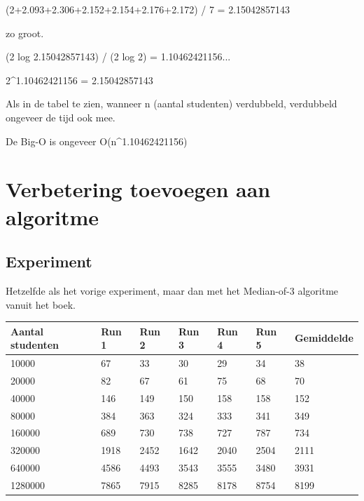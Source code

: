 \documentclass[12pt,notitlepage]{article}
\begin{document}
(2+2.093+2.306+2.152+2.154+2.176+2.172) / 7 = 2.15042857143

zo groot.

(2 log 2.15042857143) / (2 log 2) = 1.10462421156...

2^{1.10462421156} = 2.15042857143

Als in de tabel te zien, wanneer n (aantal studenten) verdubbeld, verdubbeld ongeveer de tijd ook mee.

De Big-O is ongeveer O(n^{1.10462421156})	

\section{Verbetering toevoegen aan algoritme}

\subsection{Experiment}

Hetzelfde als het vorige experiment, maar dan met het Median-of-3 algoritme vanuit het boek.

\begin{center}
\begin{table}[htb]
\begin{tabular}{| l | l | l | l | l | l | l |}
\hline
Aantal studenten & Run 1 & Run 2 & Run 3 & Run 4 & Run 5 & Gemiddelde\\ \hline
10000 & 67 & 33 & 30 & 29 & 34 & 38\\ \hline
20000 & 82 & 67 & 61 & 75 & 68 & 70\\ \hline
40000 & 146 & 149 & 150 & 158 & 158 & 152\\ \hline
80000 & 384 & 363 & 324 & 333 & 341 & 349\\ \hline
160000 & 689 & 730 & 738 & 727 & 787 & 734\\ \hline
320000 & 1918 & 2452 & 1642 & 2040 & 2504 & 2111\\ \hline
640000 & 4586 & 4493 & 3543 & 3555 & 3480 & 3931\\ \hline
1280000 & 7865 & 7915 & 8285 & 8178 & 8754 & 8199\\ \hline
\end{tabular}
\end{table}
\end{center}
\end{document}
